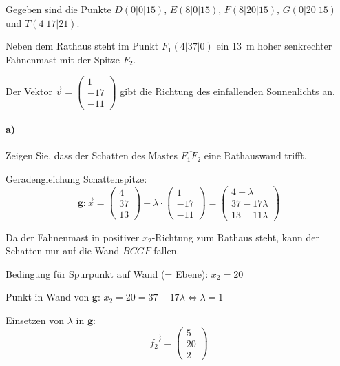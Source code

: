 \documentclass{ajc}
\numberwithin{equation}{subsection}
\begin{document}
	Gegeben sind die Punkte $D(0|0|15)$, $E(8|0|15)$, $F(8|20|15)$, \linebreak $G(0|20|15)$ und $T(4|17|21)$.
	
	Neben dem Rathaus steht im Punkt $F_1(4|37|0)$ ein \SI{13}{\m} hoher senkrechter Fahnenmast mit der Spitze $F_2$.
	
	Der Vektor $\overrightarrow{v}=\left(\begin{array}{r} 1 \\ -17 \\ -11\end{array}\right)$ gibt die Richtung des einfallenden Sonnenlichts an.
	
	\paragraph{a)} Zeigen Sie, dass der Schatten des Mastes $\overline{F_1F_2}$ eine Rathauswand trifft.
	
	Geradengleichung Schattenspitze:
	\begin{equation}
		\mathbf{g}: \overrightarrow{x}=\left(\begin{array}{r} 4 \\ 37 \\ 13\end{array}\right) + \lambda \cdot \left(\begin{array}{r} 1 \\ -17 \\ -11\end{array}\right) = \left(\begin{array}{r} 4 + \lambda \\ 37 - 17 \lambda \\ 13 - 11 \lambda\end{array}\right)
	\end{equation}
	
	Da der Fahnenmast in positiver $x_2$-Richtung zum Rathaus steht, kann der Schatten nur auf die Wand $BCGF$ fallen.
	
	Bedingung für Spurpunkt auf Wand (= Ebene): $x_2 = 20$
	
	Punkt in Wand von $\mathbf{g}$: $x_2 = 20 = 37 - 17 \lambda \Leftrightarrow \lambda = 1$ 
	
	Einsetzen von $\lambda$ in $\mathbf{g}$:
	\begin{equation}
		\vec{f_2'} = \left(\begin{array}{r} 5 \\ 20 \\ 2 \end{array}\right)
	\end{equation}
	
\end{document}
